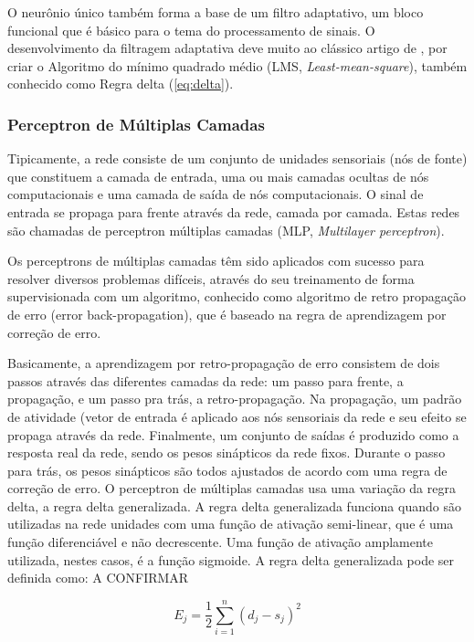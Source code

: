 O neurônio único também forma a base de um filtro adaptativo, um bloco funcional que é básico para o tema do processamento de sinais. O desenvolvimento da filtragem adaptativa deve muito ao clássico artigo de , por criar o Algoritmo do mínimo quadrado médio (LMS, \textit{Least-mean-square}), também conhecido como Regra delta (\autoref{eq:delta}).

\subsubsection{Perceptron de Múltiplas Camadas}
Tipicamente, a rede consiste de um conjunto de unidades sensoriais (nós de fonte) que constituem a camada de entrada, uma ou mais camadas ocultas de nós computacionais e uma camada de saída de nós computacionais. O sinal de entrada se propaga para frente através da rede, camada por camada. Estas redes são chamadas de perceptron múltiplas camadas (MLP, \textit{Multilayer perceptron}). 

Os perceptrons de múltiplas camadas têm sido aplicados com sucesso para resolver diversos problemas difíceis, através do seu treinamento de forma supervisionada com um algoritmo, conhecido como algoritmo de retro propagação de erro (error back-propagation), que é baseado na regra de aprendizagem por correção de erro. 

Basicamente, a aprendizagem por retro-propagação de erro consistem de dois passos através das diferentes camadas da rede: um passo para frente, a propagação, e um passo pra trás, a retro-propagação. Na propagação, um padrão de atividade (vetor de entrada é aplicado aos nós sensoriais da rede e seu efeito se propaga através da rede. Finalmente, um conjunto de saídas é produzido como a resposta real da rede, sendo os pesos sinápticos da rede fixos. Durante o passo para trás, os pesos sinápticos são todos ajustados de acordo com uma regra de correção de erro. O perceptron de múltiplas camadas usa uma variação da regra delta, a regra delta generalizada. A regra delta generalizada funciona quando são utilizadas na rede unidades com uma função de ativação semi-linear, que é uma função diferenciável e não decrescente. Uma função de ativação amplamente utilizada, nestes casos, é a função sigmoide. A regra delta generalizada pode ser definida como: {\color{red} A CONFIRMAR}

\begin{equation}
    E_{j} = \frac{1}{2} \sum_{i=1}^{n} (d_{j} - s_{j})^{2}
\end{equation}

